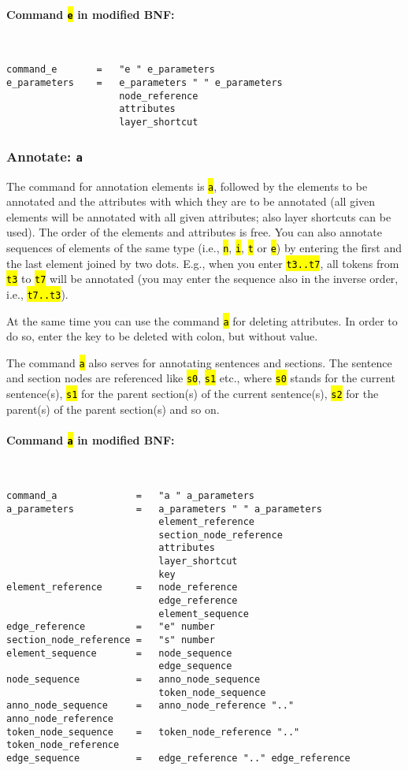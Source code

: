 \documentclass[12pt]{scrartcl}
\newcommand{\code}[1]{\hl{\texttt{#1}}}
\begin{document}
\paragraph*{Command \code{e} in modified BNF:}
~
\begin{lstlisting}
command_e       =   "e " e_parameters
e_parameters    =   e_parameters " " e_parameters
                    node_reference
                    attributes
                    layer_shortcut
\end{lstlisting}


\subsubsection{Annotate: \texttt{a}}\label{befehl-a}

The command for annotation elements is \code{a}, followed by the elements to be annotated and the attributes with which they are to be annotated (all given elements will be annotated with all given attributes; also layer shortcuts can be used).
The order of the elements and attributes is free.
You can also annotate sequences of elements of the same type (i.e., \code{n}, \code{i}, \code{t} or \code{e}) by entering the first and the last element joined by two dots.
E.g., when you enter \code{t3..t7}, all tokens from \code{t3} to \code{t7} will be annotated (you may enter the sequence also in the inverse order, i.e., \code{t7..t3}).

At the same time you can use the command \code{a} for deleting attributes.
In order to do so, enter the key to be deleted with colon, but without value.

The command \code{a} also serves for annotating sentences and sections.
The sentence and section nodes are referenced like \code{s0}, \code{s1} etc., where \code{s0} stands for the current sentence(s), \code{s1} for the parent section(s) of the current sentence(s), \code{s2} for the parent(s) of the parent section(s) and so on.

\paragraph*{Command \code{a} in modified BNF:}
~
\begin{lstlisting}
command_a              =   "a " a_parameters
a_parameters           =   a_parameters " " a_parameters
                           element_reference
                           section_node_reference
                           attributes
                           layer_shortcut
                           key
element_reference      =   node_reference
                           edge_reference
                           element_sequence
edge_reference         =   "e" number
section_node_reference =   "s" number
element_sequence       =   node_sequence
                           edge_sequence
node_sequence          =   anno_node_sequence
                           token_node_sequence
anno_node_sequence     =   anno_node_reference ".." anno_node_reference
token_node_sequence    =   token_node_reference ".." token_node_reference
edge_sequence          =   edge_reference ".." edge_reference
\end{lstlisting}
\end{document}
